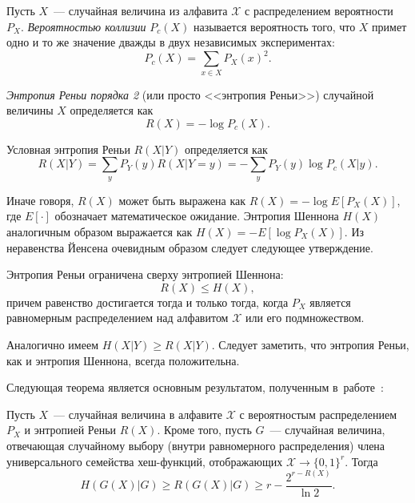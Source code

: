 \begin{definition}
  Пусть $X$~--- случайная величина из алфавита $\mathcal{X}$ с распределением вероятности $P_X$. \textit{Вероятностью коллизии} $P_c(X)$ называется вероятность того, что $X$ примет одно и то же значение дважды в двух независимых экспериментах:
  \begin{equation}
    P_c(X) = \sum_{x\in X} P_X(x)^2.
  \end{equation}
\end{definition}

\begin{definition}
  \textit{Энтропия Реньи порядка 2} (или просто <<энтропия Реньи>>) случайной величины $X$ определяется как 
  \begin{equation}
    R(X) = -\log P_c(X).
  \end{equation}
\end{definition}

\begin{definition}
  Условная энтропия Реньи $R(X|Y)$ определяется как
  \begin{equation}
    R(X|Y) = \sum_y P_Y(y) R(X|Y=y) = -\sum_y P_Y(y) \log P_c(X|y).
  \end{equation}
\end{definition}

Иначе говоря, $R(X)$ может быть выражена как $R(X) = -\log E[P_X(X)]$, где $E[\cdot]$ обозначает математическое ожидание. Энтропия Шеннона $H(X)$ аналогичным образом выражается как $H(X) = -E[\log P_X(X)]$. Из неравенства Йенсена очевидным образом следует следующее утверждение.

\begin{statement}
  Энтропия Реньи ограничена сверху энтропией Шеннона:
  $$ R(X) \leq H(X), $$
  причем равенство достигается тогда и только тогда, когда $P_X$ является равномерным распределением над алфавитом $\mathcal{X}$ или его подмножеством.
\end{statement}

Аналогично имеем $H(X|Y) \geq R(X|Y)$. Следует заметить, что энтропия Реньи, как и энтропия Шеннона, всегда положительна.

Следующая теорема является основным результатом, полученным в~работе~\cite{privacy_amplification}:

\begin{theorem}
  Пусть $X$~--- случайная величина в алфавите $\mathcal{X}$ с вероятностым распределением $P_X$ и энтропией Реньи $R(X)$. Кроме того, пусть $G$~--- случайная величина, отвечающая случайному выбору (внутри равномерного распределения) члена универсального семейства хеш-функций, отображающих $\mathcal{X} \rightarrow \{0,1\}^r$. Тогда
  \begin{equation}
    H(G(X)|G) \geq R(G(X)|G) \geq r - \frac{2^{r - R(X)}}{\ln 2}.
  \end{equation}
\end{theorem}

